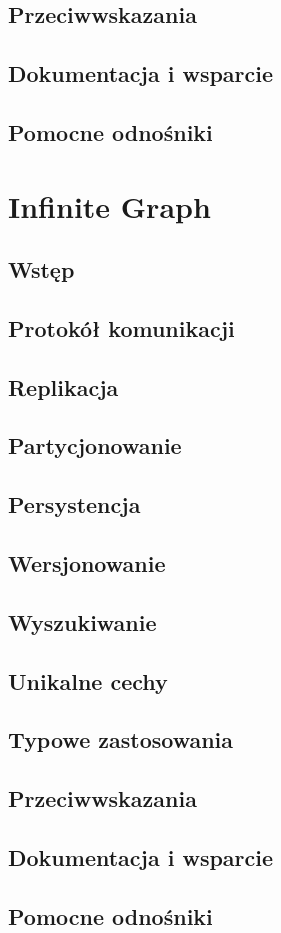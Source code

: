 \subsection*{Przeciwwskazania}

\subsection*{Dokumentacja i wsparcie}

\subsection*{Pomocne odnośniki}

\section{Infinite Graph}
\label{sec:infinite_graph}

\subsection*{Wstęp} 

\subsection*{Protokół komunikacji}

\subsection*{Replikacja}

\subsection*{Partycjonowanie}

\subsection*{Persystencja}

\subsection*{Wersjonowanie}

\subsection*{Wyszukiwanie}

\subsection*{Unikalne cechy}

\subsection*{Typowe zastosowania}

\subsection*{Przeciwwskazania}

\subsection*{Dokumentacja i wsparcie}

\subsection*{Pomocne odnośniki}
